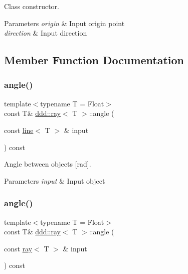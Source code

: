 Class constructor. 


\begin{DoxyParams}{Parameters}
{\em origin} & Input origin point \\
\hline
{\em direction} & Input direction \\
\hline
\end{DoxyParams}


\subsection{Member Function Documentation}
\mbox{\label{classddd_1_1ray_a148b37b45554dbdffd57c5574ad3836f}} 
\subsubsection{\texorpdfstring{angle()}{angle()}\hspace{0.1cm}{\footnotesize\ttfamily [1/4]}}
{\footnotesize\ttfamily template$<$typename T = Float$>$ \\
const T\& \hyperlink{classddd_1_1ray}{ddd\+::ray}$<$ T $>$\+::angle (\begin{DoxyParamCaption}\item[{const \hyperlink{classddd_1_1line}{line}$<$ T $>$ \&}]{input }\end{DoxyParamCaption}) const\hspace{0.3cm}{\ttfamily [inline]}}



Angle between objects \mbox{[}rad\mbox{]}. 


\begin{DoxyParams}{Parameters}
{\em input} & Input object \\
\hline
\end{DoxyParams}
\mbox{\label{classddd_1_1ray_a2d95fa78240a0e66d36cff629e5a8e0b}} 
\subsubsection{\texorpdfstring{angle()}{angle()}\hspace{0.1cm}{\footnotesize\ttfamily [2/4]}}
{\footnotesize\ttfamily template$<$typename T = Float$>$ \\
const T\& \hyperlink{classddd_1_1ray}{ddd\+::ray}$<$ T $>$\+::angle (\begin{DoxyParamCaption}\item[{const \hyperlink{classddd_1_1ray}{ray}$<$ T $>$ \&}]{input }\end{DoxyParamCaption}) const\hspace{0.3cm}{\ttfamily [inline]}}



